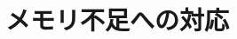 \documentclass[fleqn,a4j]{jarticle}
\begin{document}
\begin{comment}
\hutonamikasen{かきくけこ}

\hutonamikasen[2]{かきくけこ}
\end{showEx}

ただし，\cmd{hutonamikasen}は，内部で\cmd{scalebox}を用いていますから，
\textsf{graphicx.sty}を必要とします。
\textsf{emath}では，\textsf{emathP*.sty}を用いれば，\textsf{graphicx.sty}
は自動的に読み込まれます。

\paragraph{\cmd{namikasen}と上下のアキ}
\subparagraph{\cmd{namikasenUehosei}}
\cmd{namikasen}とその下線を引く対象との間隔を調整するコマンドが\\
\cmd{namikasenUehosei}です。

\begin{showEx}(.54,.4){\cmd{namikasenUehosei}}
\namikasen{かきくけこ}

下線の位置を対象に近づけたければ

\namikasenUehosei{-2pt}
\namikasen{かきくけこ}
\end{showEx}

\cmd{namikasenUehosei}の引数に，波線縦位置を補正する数値（単位付）を与えます。
正の値を与えれば下に，負の値を与えれば上に動きます。

\subparagraph{\cmd{namikasenSitahosei}}
逆に下線の下，すなわち下線と下の行との間隔を調整するのが\\
\cmd{namikasenSitahosei}です。

\begin{showEx}(.54,.4){\cmd{namikasenSitahosei}}
標準は\namikasen{かきくけこ}
おおおおおおおおおおおおおおおおおお
おおおおおおおおおおおおおおおおおお
おおおおおおおおおおおおおおおおおお

下線と次の行を離したければ

\namikasenSitahosei{10pt}
標準は\namikasen{かきくけこ}
おおおおおおおおおおおおおおおおおお
おおおおおおおおおおおおおおおおおお
おおおおおおおおおおおおおおおおおお
\end{showEx}

上の例，後半では\verb+\namikasenSitahosei{10pt}+として，
波下線と次の行との間隔をデフォルトより\verb+10pt+増やしています。
\end{comment}

\section{メモリ不足への対応}
\end{document}

